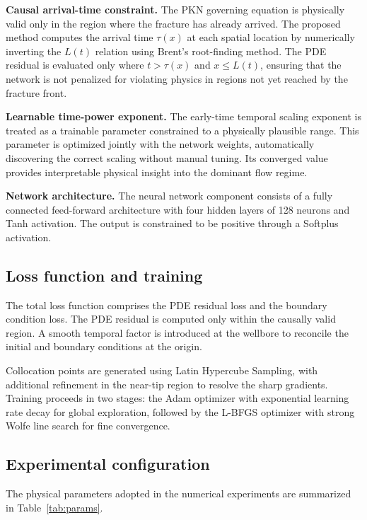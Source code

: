 \documentclass{ws-ijcm}
\begin{document}
\textbf{Causal arrival-time constraint.} The PKN governing equation is
physically valid only in the region where the fracture has already
arrived. The proposed method computes the arrival time $\tau(x)$ at
each spatial location by numerically inverting the $L(t)$ relation
using Brent's root-finding method. The PDE residual is evaluated only
where $t > \tau(x)$ and $x \leq L(t)$, ensuring that the network is not
penalized for violating physics in regions not yet reached by the
fracture front.

\textbf{Learnable time-power exponent.} The early-time temporal scaling
exponent is treated as a trainable parameter constrained to a
physically plausible range. This parameter is optimized jointly with the
network weights, automatically discovering the correct scaling without
manual tuning. Its converged value provides interpretable physical
insight into the dominant flow regime.

\textbf{Network architecture.} The neural network component consists of
a fully connected feed-forward architecture with four hidden layers of
128 neurons and Tanh activation. The output is constrained to be
positive through a Softplus activation.

\subsection{Loss function and training}

The total loss function comprises the PDE residual loss and the
boundary condition loss. The PDE residual is computed only within the
causally valid region. A smooth temporal factor is introduced at the
wellbore to reconcile the initial and boundary conditions at the
origin.

Collocation points are generated using Latin Hypercube Sampling, with
additional refinement in the near-tip region to resolve the sharp
gradients. Training proceeds in two stages: the Adam optimizer with
exponential learning rate decay for global exploration, followed by the
L-BFGS optimizer with strong Wolfe line search for fine convergence.

\subsection{Experimental configuration}

The physical parameters adopted in the numerical experiments are
summarized in Table~\ref{tab:params}.
\end{document}
